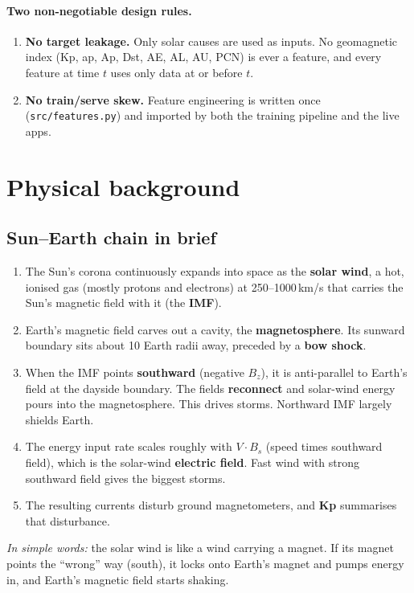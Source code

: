 \documentclass[11pt,a4paper]{article}
\newcommand{\code}[1]{\texttt{#1}}
\newcommand{\easy}[1]{\textit{In simple words:} #1}
\begin{document}
\paragraph{Two non-negotiable design rules.}
\begin{enumerate}
\item \textbf{No target leakage.} Only solar causes are used as inputs. No geomagnetic index (Kp, ap, Ap, Dst,
AE, AL, AU, PCN) is ever a feature, and every feature at time $t$ uses only data at or before $t$.
\item \textbf{No train/serve skew.} Feature engineering is written once (\code{src/features.py}) and imported by
both the training pipeline and the live apps.
\end{enumerate}

\section{Physical background}
\subsection{Sun--Earth chain in brief}
\begin{enumerate}
\item The Sun's corona continuously expands into space as the \textbf{solar wind}, a hot, ionised gas
(mostly protons and electrons) at 250--1000\,km/s that carries the Sun's magnetic field with it (the
\textbf{IMF}).
\item Earth's magnetic field carves out a cavity, the \textbf{magnetosphere}. Its sunward boundary sits about
10 Earth radii away, preceded by a \textbf{bow shock}.
\item When the IMF points \textbf{southward} (negative $B_z$), it is anti-parallel to Earth's field at the dayside
boundary. The fields \textbf{reconnect} and solar-wind energy pours into the magnetosphere. This drives storms.
Northward IMF largely shields Earth.
\item The energy input rate scales roughly with $V\cdot B_s$ (speed times southward field), which is the
solar-wind \textbf{electric field}. Fast wind with strong southward field gives the biggest storms.
\item The resulting currents disturb ground magnetometers, and \textbf{Kp} summarises that disturbance.
\end{enumerate}
\easy{the solar wind is like a wind carrying a magnet. If its magnet points the ``wrong'' way (south), it
locks onto Earth's magnet and pumps energy in, and Earth's magnetic field starts shaking.}
\end{document}
